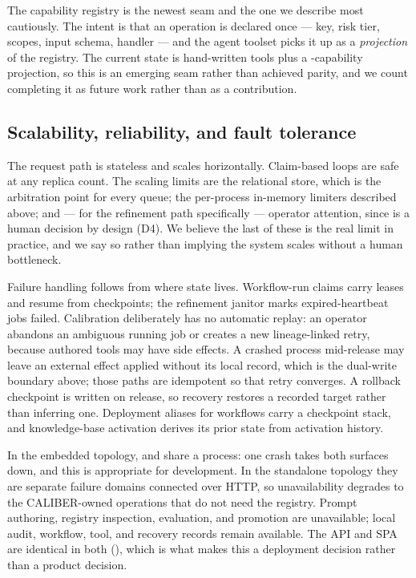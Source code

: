 The \aria{} capability registry is the newest seam and the one we describe most
cautiously. The intent is that an operation is declared once --- key, risk tier,
scopes, input schema, handler --- and the agent toolset picks it up as a
\emph{projection} of the registry. The current state is \statAriaTools{}
hand-written tools plus a \statAriaProjected{}-capability projection, so this is an
emerging seam rather than achieved parity, and we count completing it as future work
rather than as a contribution.

\subsection{Scalability, reliability, and fault tolerance}

 The request path is stateless and scales horizontally.
Claim-based loops are safe at any replica count. The scaling limits are the
relational store, which is the arbitration point for every queue; the per-process
in-memory limiters described above; and --- for the refinement path specifically ---
operator attention, since  is a human decision by design (D4). We
believe the last of these is the real limit in practice, and we say so rather than
implying the system scales without a human bottleneck.

 Failure handling follows from where state lives. Workflow-run
claims carry leases and resume from checkpoints; the refinement janitor marks
expired-heartbeat jobs failed. Calibration deliberately has no automatic replay:
an operator abandons an ambiguous running job or creates a new lineage-linked
retry, because authored tools may have side effects. A crashed process mid-release may leave an
external effect applied without its local record, which is the dual-write boundary
above; those paths are idempotent so that retry converges. A rollback checkpoint is
written on release, so recovery restores a recorded target rather than inferring
one. Deployment aliases for workflows carry a checkpoint stack, and knowledge-base
activation derives its prior state from activation history.



 In the embedded topology, \sys and
\mlflow{} share a process: one crash takes both surfaces down, and this is
appropriate for development. In the standalone topology they are separate failure
domains connected over HTTP, so \mlflow{} unavailability degrades \sys to the
CALIBER-owned operations that do not need the registry. Prompt authoring,
registry inspection, evaluation, and promotion are unavailable; local audit,
workflow, tool, and recovery records remain available. The API and SPA are identical in
both (), which is what makes this a deployment decision
rather than a product decision.
